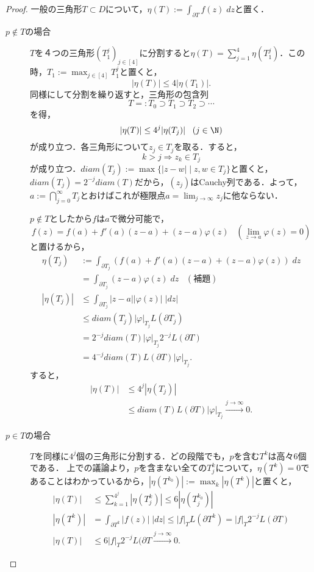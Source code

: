 \documentclass[uplatex, dvipdfmx]{jsreport}
\begin{document}
\begin{proof}
    一般の三角形$T\subset D$について，$\eta(T):=\int_{\partial T}f(z)\;dz$と置く．
    \begin{description}
        \item[$p\notin T$の場合] $T$を４つの三角形$(T_1^j)_{j\in[4]}$に分割すると$\eta(T)=\sum^4_{j=1}\eta(T_1^j)$．この時，$T_1:=\max_{j\in[4]}T_1^j$と置くと，
        \[|\eta(T)|\le 4|\eta(T_1)|.\]
        同様にして分割を繰り返すと，三角形の包含列
        \[ T=:T_0\supset T_1\supset T_2\supset\cdots \]
        を得，
        \[ |\eta(T)|\le 4^{j}|\eta(T_j)|\;\;\;(j\in\N) \]
        が成り立つ．各三角形について$z_j\in T_j$を取る．すると，
        \[ k>j\Rightarrow z_k\in T_j \]
        が成り立つ．$diam(T_j):=\max\{|z-w|\mid z,w\in T_j\}$と置くと，$diam(T_j)=2^{-j}diam(T)$だから，$(z_j)$はCauchy列である．よって，$a:=\bigcap_{j=0}^\infty T_j$とおけばこれが極限点$a=\lim_{j\to\infty}z_j$に他ならない．

        $p\notin T$としたから$f$は$a$で微分可能で，
        \[ f(z)=f(a)+f'(a)(z-a)+(z-a)\varphi(z)\;\;\;(\lim_{z\to a}\varphi(z)=0) \]
        と置けるから，
        \begin{align*}
            \eta(T_j)&:=\int_{\partial T_j}(f(a)+f'(a)(z-a)+(z-a)\varphi(z))\;dz\\
            &=\int_{\partial T_j}(z-a)\varphi(z)\;dz\;\;\;(補題)\\
            |\eta(T_j)|&\le\int_{\partial T_j}|z-a||\varphi(z)|\;|dz|\\
            &\le diam(T_j)|\varphi|_{T_j}L(\partial T_j)\\
            &= 2^{-j}diam(T)|\varphi|_{T_j}2^{-j}L(\partial T)\\
            &= 4^{-j}diam(T)L(\partial T)|\varphi|_{T_j}.
        \end{align*}
        すると，
        \begin{align*}
            |\eta(T)|&\le 4^j|\eta(T_j)|\\
            &\le diam(T)L(\partial T)|\varphi|_{T_j}\xrightarrow{j\to\infty}0.
        \end{align*}
        \item[$p\in T$の場合] $T$を同様に$4^j$個の三角形に分割する．どの段階でも，$p$を含む$T^k$は高々$6$個である．
        上での議論より，$p$を含まない全ての$T^k_j$について，$\eta(T^k)=0$であることはわかっているから，$|\eta(T^{k_0})|:=\max_{k}|\eta(T^k)|$と置くと，
        \begin{align*}
            |\eta(T)|&\le\sum^{4^j}_{k=1}|\eta(T^k_j)|\le 6|\eta(T^{k_0}_j)|\\
            |\eta(T^k)|&=\int_{\partial T^k}|f(z)|\;|dz|\le|f|_TL(\partial T^k)=|f|_T2^{-j}L(\partial T)\\
            |\eta(T)|&\le 6|f|_T2^{-j}L(\partial T\xrightarrow{j\to\infty}0.
        \end{align*}
    \end{description}
\end{proof}
\end{document}
